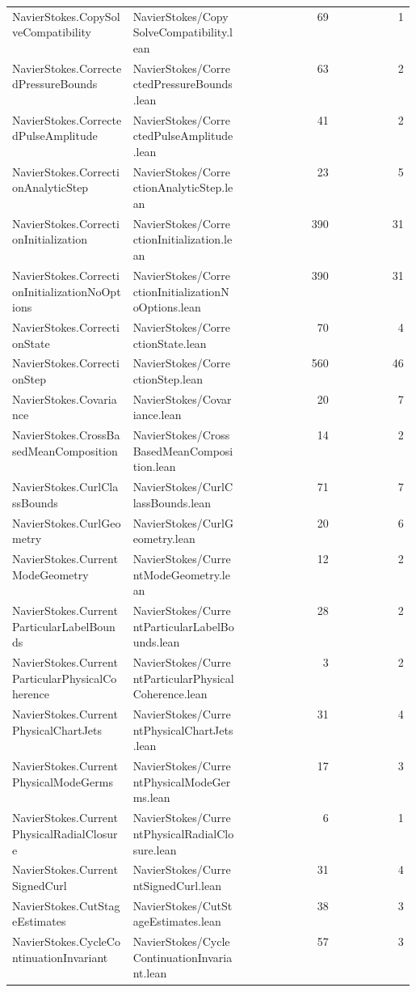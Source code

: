\begin{longtable}{p{0.30\linewidth}p{0.28\linewidth}rr}
NavierStokes.CopySolveCompatibility & NavierStokes/CopySolveCompatibility.lean & 69 & 1\\
NavierStokes.CorrectedPressureBounds & NavierStokes/CorrectedPressureBounds.lean & 63 & 2\\
NavierStokes.CorrectedPulseAmplitude & NavierStokes/CorrectedPulseAmplitude.lean & 41 & 2\\
NavierStokes.CorrectionAnalyticStep & NavierStokes/CorrectionAnalyticStep.lean & 23 & 5\\
NavierStokes.CorrectionInitialization & NavierStokes/CorrectionInitialization.lean & 390 & 31\\
NavierStokes.CorrectionInitializationNoOptions & NavierStokes/CorrectionInitializationNoOptions.lean & 390 & 31\\
NavierStokes.CorrectionState & NavierStokes/CorrectionState.lean & 70 & 4\\
NavierStokes.CorrectionStep & NavierStokes/CorrectionStep.lean & 560 & 46\\
NavierStokes.Covariance & NavierStokes/Covariance.lean & 20 & 7\\
NavierStokes.CrossBasedMeanComposition & NavierStokes/CrossBasedMeanComposition.lean & 14 & 2\\
NavierStokes.CurlClassBounds & NavierStokes/CurlClassBounds.lean & 71 & 7\\
NavierStokes.CurlGeometry & NavierStokes/CurlGeometry.lean & 20 & 6\\
NavierStokes.CurrentModeGeometry & NavierStokes/CurrentModeGeometry.lean & 12 & 2\\
NavierStokes.CurrentParticularLabelBounds & NavierStokes/CurrentParticularLabelBounds.lean & 28 & 2\\
NavierStokes.CurrentParticularPhysicalCoherence & NavierStokes/CurrentParticularPhysicalCoherence.lean & 3 & 2\\
NavierStokes.CurrentPhysicalChartJets & NavierStokes/CurrentPhysicalChartJets.lean & 31 & 4\\
NavierStokes.CurrentPhysicalModeGerms & NavierStokes/CurrentPhysicalModeGerms.lean & 17 & 3\\
NavierStokes.CurrentPhysicalRadialClosure & NavierStokes/CurrentPhysicalRadialClosure.lean & 6 & 1\\
NavierStokes.CurrentSignedCurl & NavierStokes/CurrentSignedCurl.lean & 31 & 4\\
NavierStokes.CutStageEstimates & NavierStokes/CutStageEstimates.lean & 38 & 3\\
NavierStokes.CycleContinuationInvariant & NavierStokes/CycleContinuationInvariant.lean & 57 & 3\\

\end{longtable}
